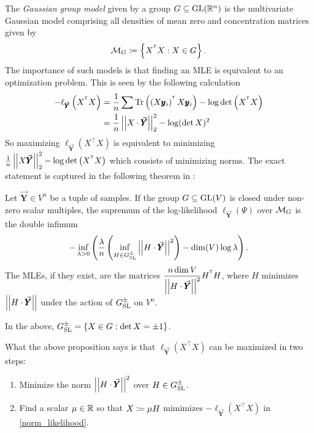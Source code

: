 The \emph{Gaussian group model} given by a group $G \subseteq \operatorname{GL}(\mathbb{R}^n)$ is the multivariate Gaussian model comprising all densities of mean zero and concentration matrices given by $$\cM_G\sett \set{X^\intercal X: X\in G}.$$ The importance of such models is that finding an MLE is equivalent to an optimization problem. This is seen by the following calculation
\begin{align}
-\ell_{\vec{\pmb Y}}\left(X^\intercal X\right) &= \frac{1}{n}\sum\Tr \left(\left(X\pmb y_i\right)^\intercal X\pmb y_i\right) - \log\det \left(X^\intercal X\right)\\
\label{norm_likelihood}&= \frac{1}{n} \sz{X\cdot \vec{\pmb Y}}_2^2 - \log(\det X)^2
\end{align}
So maximizing $\ell_{\vec{\pmb Y}}\left(X^\intercal X\right)$ is equivalent to minimizing $\frac{1}{n} \sz{X\vec{\pmb Y}}_2^2 - \log\det \left(X^\intercal X\right)$ which consists of minimizing norms. The exact statement is captured in the following theorem in \cite[Proposition 3.4]{mainpaper}:
\begin{prop}
Let $\vec{\pmb Y}\in V^n$ be a tuple of samples. If the group $G\subseteq \operatorname{GL}(V)$ is closed under non-zero scalar multiples, the supremum of the log-likelihood $\ell_{\vec{\pmb Y}}(\Psi)$ over ${\mathcal{M}}_G$ is the double infimum $$-\inf_{\lambda>0}\left( \frac{\lambda}{n} \left( \inf_{H\in G_{\operatorname{SL}}^{\pm}} \left|\left| H\cdot \vec{\pmb Y} \right|\right|^2 \right) - \dim (V) \log \lambda\right).$$
The MLEs, if they exist, are the matrices $\displaystyle \frac{n \dim V}{\sz{H\cdot \vec{\pmb Y}}^2} H^\intercal H$, where $H$ minimizes $\left|\left| H\cdot \vec{\pmb Y} \right|\right|$ under the action of $G_{\operatorname{SL}}^\pm$ on $V^n$.
\end{prop}
In the above, $G_{\operatorname{SL}}^\pm = \left\{X\in G: \det X = \pm 1\right\}$. 

What the above proposition says is that $\ell_{\vec{\pmb Y}}\left(X^\intercal X\right)$ can be maximized in two steps:
\begin{enumerate} 
\item Minimize the norm $\left|\left| H\cdot \vec{\pmb Y} \right|\right|^2$ over $H\in G_{\operatorname{SL}}^\pm$.
\item Find a scalar $\mu\in \mathbb{R}$ so that $X\coloneqq \mu H$ mimimizes $-\ell_{\vec{\pmb Y}}\left(X^\intercal X\right)$ in \cref{norm_likelihood}.
\end{enumerate}

